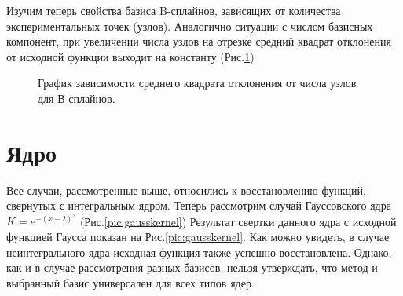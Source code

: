 Изучим теперь свойства базиса B-сплайнов, зависящих от количества экспериментальных точек (узлов). Аналогично ситуации с числом базисных компонент, при увеличении числа узлов на отрезке средний квадрат отклонения от исходной функции выходит на константу (Рис.\ref{pic:graf2})
\begin{figure}[h! ]
	\label{pic:7}
	\caption{График зависимости среднего квадрата отклонения от числа узлов для В-сплайнов.}
	\label{pic:graf2}
\end{figure}


\section{Ядро}

Все случаи, рассмотренные выше, относились к восстановлению функций, свернутых с интегральным ядром. Теперь рассмотрим случай Гауссовского ядра $K=e^{-(x-2)^2}$ (Рис.\ref{pic:gausskernel}) Результат свертки данного ядра с исходной функцией Гаусса показан на Рис.\ref{pic:gausskernel}. Как можно увидеть, в случае неинтегрального ядра исходная функция также успешно восстановлена. Однако, как и в случае рассмотрения разных базисов, нельзя утверждать, что метод и выбранный базис универсален для всех типов ядер.

\begin{comment}
\begin{figure}[h! ]
\begin{center}
\begin{minipage}[h]{0.3\linewidth}
	\texttt{[image: func\_10]} \\а)
\end{minipage}
	\hfill
\begin{minipage}[h]{0.3\linewidth}
\texttt{[image: pic10a]} \\б)
\end{minipage}
\hfill
\begin{minipage}[h]{0.3\linewidth}
	\texttt{[image: pic10b]} \\в)
\end{minipage}
	\caption{Случай неинтегрального ядра. а) Экспериментальные значения. б) Ядро $K=e^{-(x-2)^2}$. в) Результат восстановления с помощью базиса Фурье (20 компонент) со статистическими погрешностями 1\%, зеленая линия --- исходная функция, красная линия с точками --- результат регуляризации.}
\label{pic:gausskernel}
\end{center}
\end{figure}
\end{comment}
   
